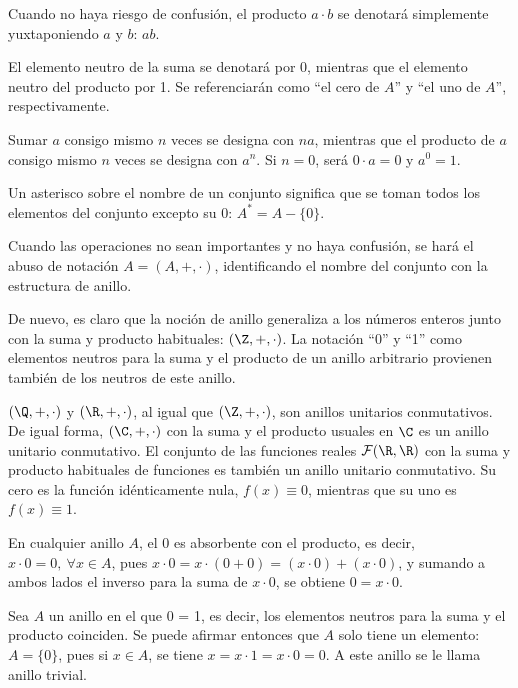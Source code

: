 \begin{nott} 
        \item Cuando no haya riesgo de confusión, el producto $a \cdot b$ se denotará simplemente yuxtaponiendo $a$ y $b$: $ab$.
        \item El elemento neutro de la suma se denotará por 0, mientras que el elemento neutro del producto por 1. Se referenciarán como ``el cero de $A$'' y ``el uno de $A$'', respectivamente.
        \item Sumar $a$ consigo mismo $n$ veces se designa con $na$, mientras que el producto de $a$ consigo mismo $n$ veces se designa con $a^n$. Si $n = 0$, será $0\cdot a = 0$ y $a^0 = 1$.
        \item Un asterisco sobre el nombre de un conjunto significa que se toman todos los elementos del conjunto excepto su 0: $A^* = A - \{0\}$.
        \item Cuando las operaciones no sean importantes y no haya confusión, se hará el abuso de notación $A = (A, +, \cdot)$, identificando el nombre del conjunto con la estructura de anillo.
  \end{nott}

\begin{obs}
    De nuevo, es claro que la noción de anillo generaliza a los números enteros junto con la suma y producto habituales: $(\Z,+, \cdot)$. La notación ``0'' y ``1'' como elementos neutros para la suma y el producto de un anillo arbitrario provienen también de los neutros de este anillo.
\end{obs}
    
\begin{ejs}
    \item$(\Q,+, \cdot)$ y $(\R,+, \cdot)$, al igual que $(\Z,+, \cdot)$, son anillos unitarios conmutativos. De igual forma, $(\C,+, \cdot)$ con la suma y el producto usuales en $\C$ es un anillo unitario conmutativo. El conjunto de las funciones reales $\mathcal{F}(\R, \R)$ con la suma y producto habituales de funciones es también un anillo unitario conmutativo. Su cero es la función idénticamente nula, $f(x) \equiv 0$, mientras que su uno es $f(x) \equiv 1$.

    \item En cualquier anillo $A$, el 0 es absorbente con el producto, es decir, $x\cdot0 = 0,\ \forall x\in A$, pues $x\cdot 0 = x \cdot (0 + 0) = (x\cdot0) + (x\cdot 0)$, y sumando a ambos lados el inverso para la suma de $x\cdot 0$, se obtiene $0 = x \cdot 0$.
    
    \item Sea $A$ un anillo en el que 0 = 1, es decir, los elementos neutros para la suma y el producto coinciden. Se puede afirmar entonces que $A$ solo tiene un elemento: $A = \{0\}$, pues si $x\in A$, se tiene $x = x\cdot 1 = x\cdot0 = 0$. A este anillo se le llama anillo trivial.   
\end{ejs}


